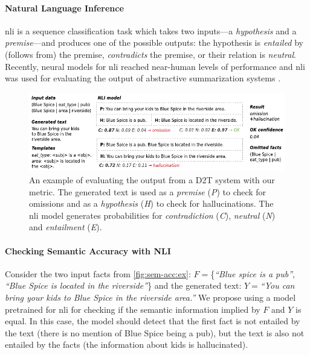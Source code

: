 \paragraph{Natural Language Inference} \ac{nli} is a sequence classification task which takes two inputs---a \textit{hypothesis} and a \textit{premise}---and produces one of the possible outputs: the hypothesis is \textit{entailed} by (follows from) the premise, \textit{contradicts} the premise, or their relation is \textit{neutral}. Recently, neural models for \ac{nli} \cite{zhang2019semantics,liu-etal-2019-multi,liuRoBERTaRobustlyOptimized2019} reached near-human levels of performance and \ac{nli} was used for evaluating the output of abstractive summarization systems \cite{maynezFaithfulnessFactualityAbstractive2020}.


\begin{figure}[t]
    \centering
    \includegraphics[width=\textwidth]{img/2020_nli_inlg}
    \caption{An example of evaluating the output from a D2T system with our metric. The generated text is used as a \textit{premise} (\textit{P}) to check for omissions and as a \textit{hypothesis} (\textit{H}) to check for hallucinations. The \ac{nli} model generates probabilities for \textit{contradiction} (\textit{C}), \textit{neutral} (\textit{N}) and \textit{entailment} (\textit{E}).}
    \label{fig:sem-acc:ex}
\end{figure}

\paragraph{Checking Semantic Accuracy with NLI} Consider the two input facts from \autoref{fig:sem-acc:ex}: $F= $\{\emph{``Blue spice is a pub''}, \emph{``Blue Spice is located in the riverside''}\} and the generated text: $Y= $\emph{``You can bring your kids to Blue Spice in the riverside area.''} We propose using a model pretrained for \ac{nli} for checking if the semantic information implied by $F$ and $Y$ is equal.
In this case, the model should detect that the first fact is not entailed by the text (there is no mention of Blue Spice being a pub), but the text is also not entailed by the facts (the information about kids is hallucinated).

